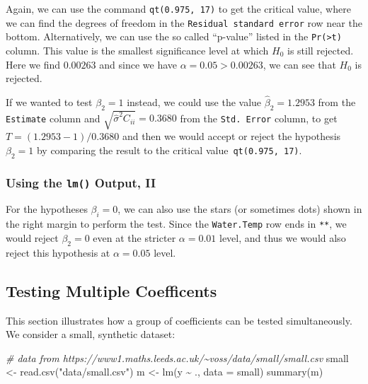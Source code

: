 \documentclass[
  a4paper,
]{article}
\newenvironment{Shaded}{\begin{snugshade}}{\end{snugshade}}
\newcommand{\AttributeTok}[1]{\textcolor[rgb]{0.77,0.63,0.00}{#1}}
\newcommand{\CommentTok}[1]{\textcolor[rgb]{0.56,0.35,0.01}{\textit{#1}}}
\newcommand{\FunctionTok}[1]{\textcolor[rgb]{0.00,0.00,0.00}{#1}}
\newcommand{\NormalTok}[1]{#1}
\newcommand{\OtherTok}[1]{\textcolor[rgb]{0.56,0.35,0.01}{#1}}
\newcommand{\SpecialCharTok}[1]{\textcolor[rgb]{0.00,0.00,0.00}{#1}}
\newcommand{\StringTok}[1]{\textcolor[rgb]{0.31,0.60,0.02}{#1}}
\theoremstyle{definition}
\theoremstyle{definition}
\theoremstyle{definition}
\theoremstyle{definition}
\theoremstyle{remark}
\begin{document}
Again, we can use the command \texttt{qt(0.975,\ 17)} to get the critical value, where
we can find the degrees of freedom in the \texttt{Residual\ standard\ error} row near
the bottom. Alternatively, we can use the so called ``p-value'' listed in the
\texttt{Pr(\textgreater{}\textbar{}t\textbar{})} column. This value is the smallest significance level at which
\(H_0\) is still rejected. Here we find \(0.00263\) and since we have
\(\alpha = 0.05 > 0.00263\), we can see that \(H_0\) is rejected.

If we wanted to test \(\beta_2 = 1\) instead, we could use the value \(\hat\beta_2 = 1.2953\) from the \texttt{Estimate} column and \(\sqrt{\hat\sigma^2 C_{ii}} = 0.3680\)
from the \texttt{Std.\ Error} column, to get \(T = (1.2953 - 1) / 0.3680\) and then we
would accept or reject the hypothesis \(\beta_2 = 1\) by comparing the result to
the critical value~\texttt{qt(0.975,\ 17)}.

\hypertarget{using-the-lm-output-ii}{%
\subsubsection{\texorpdfstring{Using the \texttt{lm()} Output, II}{Using the lm() Output, II}}\label{using-the-lm-output-ii}}

For the hypotheses \(\beta_i = 0\), we can also use the stars (or sometimes dots)
shown in the right margin to perform the test. Since the \texttt{Water.Temp} row ends
in \texttt{**}, we would reject \(\beta_2 = 0\) even at the stricter \(\alpha=0.01\)
level, and thus we would also reject this hypothesis at \(\alpha=0.05\) level.

\hypertarget{testing-multiple-coefficents}{%
\subsection{Testing Multiple Coefficents}\label{testing-multiple-coefficents}}

This section illustrates how a group of coefficients can be tested
simultaneously. We consider a small, synthetic dataset:

\begin{Shaded}
\begin{Highlighting}[]
\CommentTok{\# data from https://www1.maths.leeds.ac.uk/\textasciitilde{}voss/data/small/small.csv}
\NormalTok{small }\OtherTok{\textless{}{-}} \FunctionTok{read.csv}\NormalTok{(}\StringTok{"data/small.csv"}\NormalTok{)}
\NormalTok{m }\OtherTok{\textless{}{-}} \FunctionTok{lm}\NormalTok{(y }\SpecialCharTok{\textasciitilde{}}\NormalTok{ ., }\AttributeTok{data =}\NormalTok{ small)}
\FunctionTok{summary}\NormalTok{(m)}
\end{Highlighting}
\end{Shaded}
\end{document}
